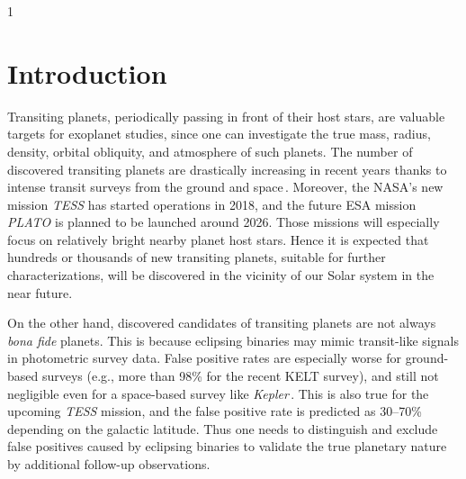 \documentclass[a4paper,12pt]{spieman}  %
\begin{document}
\begin{spacing}{1}   %

\section{Introduction}
\label{sect:intro}  %

Transiting planets, periodically passing in front of their host stars, are
valuable targets for exoplanet studies, since one can investigate
the true mass, radius, density, orbital obliquity, and atmosphere of such planets.
The number of discovered transiting planets are drastically increasing in recent years
thanks to intense transit surveys from the ground
\cite{2007ApJ...656..552B,2007MNRAS.375..951C,2012ApJ...761..123S,2009Natur.462..891C,2016Natur.533..221G,2018MNRAS.475.4476W}
and space\cite{2006cosp...36.3749B,2010Sci...327..977B,2014PASP..126..398H}\,\!.
Moreover, the NASA's new mission {\it TESS}\cite{2015JATIS...1a4003R} has started operations in 2018, and 
the future ESA mission {\it PLATO}\cite{2014ExA....38..249R} is planned to be launched around 2026.
Those missions will especially focus on relatively bright nearby planet host stars.
Hence it is expected that hundreds or thousands of new transiting planets, suitable for
further characterizations, will be discovered in the vicinity of our Solar system in the near future.

On the other hand, discovered candidates of transiting planets are not always {\it bona fide} planets.
This is because eclipsing binaries may mimic transit-like signals in photometric survey data.
False positive rates are especially worse for ground-based surveys (e.g., more than 98\% for
the recent KELT survey\cite{2018arXiv180301869C}),
and still not negligible even for a space-based survey
like {\it Kepler}\cite{2012A&A...545A..76S}\,\!.
This is also true for the upcoming {\it TESS} mission,
and the false positive rate is predicted as
30--70\%\cite{2015ApJ...809...77S} depending on the galactic latitude.
Thus one needs to distinguish and exclude false positives caused by eclipsing binaries
to validate the true planetary nature by additional follow-up observations.


\end{spacing}
\end{document}
